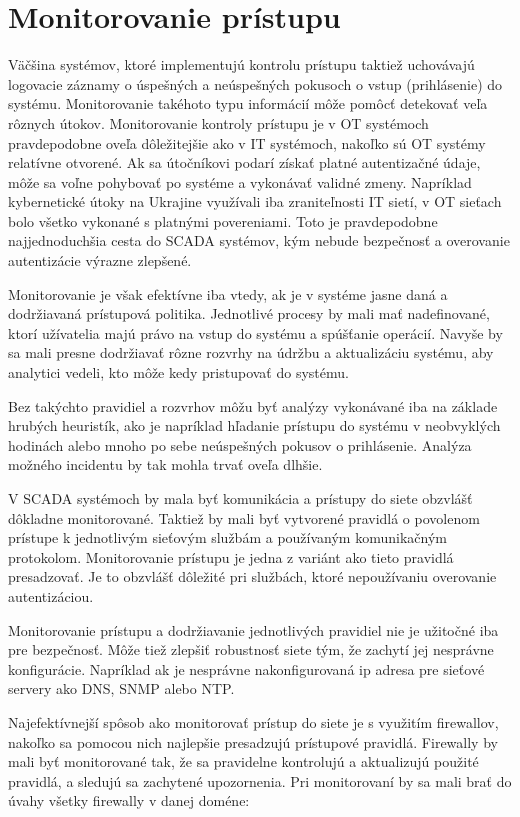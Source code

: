 \section{Monitorovanie prístupu}
\tab Väčšina systémov, ktoré implementujú kontrolu prístupu taktiež uchovávajú logovacie záznamy o úspešných a neúspešných pokusoch o vstup (prihlásenie) do systému. Monitorovanie takéhoto typu informácií môže pomôcť detekovať veľa rôznych útokov. Monitorovanie kontroly prístupu je v OT systémoch pravdepodobne oveľa dôležitejšie ako v IT systémoch, nakoľko sú OT systémy relatívne otvorené. Ak sa útočníkovi podarí získať platné autentizačné údaje, môže sa voľne pohybovať po systéme a vykonávať validné zmeny. Napríklad kybernetické útoky na Ukrajine využívali iba zraniteľnosti IT sietí, v OT sieťach bolo všetko vykonané s platnými povereniami. Toto je pravdepodobne najjednoduchšia cesta do SCADA systémov, kým nebude bezpečnosť a overovanie autentizácie výrazne zlepšené. \par
Monitorovanie je však efektívne iba vtedy, ak je v systéme jasne daná a dodržiavaná prístupová politika. Jednotlivé procesy by mali mať nadefinované, ktorí užívatelia majú právo na vstup do systému a spúšťanie operácií. Navyše by sa mali presne dodržiavať rôzne rozvrhy na údržbu a aktualizáciu systému, aby analytici vedeli, kto môže kedy pristupovať do systému. \par
Bez takýchto pravidiel a rozvrhov môžu byť analýzy vykonávané iba na základe hrubých heuristík, ako je napríklad hľadanie prístupu do systému v neobvyklých hodinách alebo mnoho po sebe neúspešných pokusov o prihlásenie. Analýza možného incidentu by tak mohla trvať oveľa dlhšie. \par
V SCADA systémoch by mala byť komunikácia a prístupy do siete obzvlášť dôkladne monitorované. Taktiež by mali byť vytvorené pravidlá o povolenom prístupe k jednotlivým sieťovým službám a používaným komunikačným protokolom. Monitorovanie prístupu je jedna z variánt ako tieto pravidlá presadzovať. Je to obzvlášť dôležité pri službách, ktoré nepoužívaniu overovanie autentizáciou. \par
Monitorovanie prístupu a dodržiavanie jednotlivých pravidiel nie je užitočné iba pre bezpečnosť. Môže tiež zlepšiť robustnosť siete tým, že zachytí jej nesprávne konfigurácie. Napríklad ak je nesprávne nakonfigurovaná ip adresa pre sieťové servery ako DNS, SNMP alebo NTP. \par
Najefektívnejší spôsob ako monitorovať prístup do siete je s využitím firewallov, nakoľko sa pomocou nich najlepšie presadzujú prístupové pravidlá. Firewally by mali byť monitorované tak, že sa pravidelne kontrolujú a aktualizujú použité pravidlá, a sledujú sa zachytené upozornenia. Pri monitorovaní by sa mali brať do úvahy všetky firewally v danej doméne:
